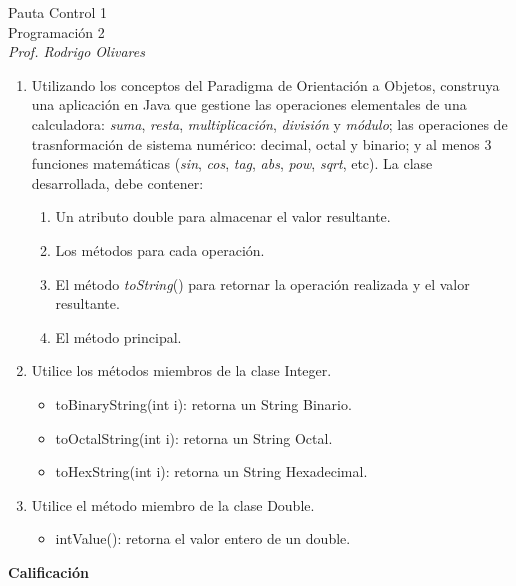 \documentclass[10pt]{article}
\begin{document}
\begin{center}
	{\Large Pauta Control 1}\\
	Programaci\'on 2 \\
	\emph{\small Prof. Rodrigo Olivares}
\end{center}

\begin{enumerate}
    \item[ ] Utilizando los conceptos del Paradigma de Orientaci\'on a Objetos, construya una aplicaci\'on en Java que gestione las operaciones elementales de una calculadora: \emph{suma}, \emph{resta}, \emph{multiplicaci\'on}, \emph{divisi\'on} y \emph{m\'odulo}; las operaciones de trasnformaci\'on de sistema num\'erico: decimal, octal y binario; y al menos 3 funciones matem\'aticas (\emph{sin}, \emph{cos}, \emph{tag}, \emph{abs}, \emph{pow}, \emph{sqrt}, etc). La clase desarrollada, debe contener:
    \begin{enumerate}
	    \item Un atributo double para almacenar el valor resultante.
	    \item Los m\'etodos para cada operaci\'on.
	    \item El m\'etodo \emph{toString}() para retornar la operaci\'on realizada y el valor resultante. 
	    \item El m\'etodo principal.
	\end{enumerate} 
	\item[] Utilice los m\'etodos miembros de la clase Integer.
	\begin{itemize}
	    \item toBinaryString(int i): retorna un String Binario.
	    \item toOctalString(int i): retorna un String Octal.
	    \item toHexString(int i): retorna un String Hexadecimal.
	\end{itemize}
	\item[] Utilice el m\'etodo miembro de la clase Double.
	\begin{itemize}
	    \item intValue(): retorna el valor entero de un double.
	\end{itemize}
\end{enumerate}
\textbf{Calificaci\'on}
\end{document}
